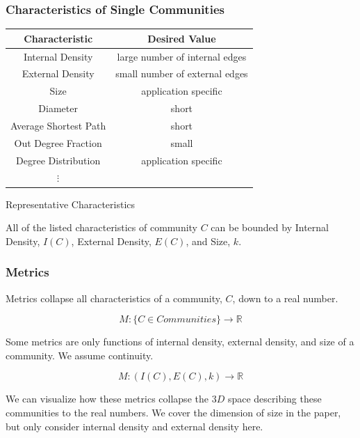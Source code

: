 \documentclass{beamer}
\begin{document}
\begin{frame}\frametitle{Characteristics of Single Communities}

\begin{table}[t]
\centering
\begin{tabular}{c|c}
Characteristic & Desired Value \\ \hline
 {\sc Internal Density} &  large number of internal edges \\
 {\sc External Density} & small number of external edges \\
 {\sc Size} & application specific\\
 {\sc Diameter} & short \\
{\sc Average Shortest Path} & short \\
{\sc Out Degree Fraction} & small \\
{\sc Degree Distribution} & application specific \\ 
$\vdots$ &
\end{tabular}
\end{table}

\begin{block}{Representative Characteristics}
\begin{center}
All of the listed characteristics of community $C$ can be bounded by {\sc Internal Density}, $I(C)$, {\sc External Density}, $E(C)$, and {\sc Size}, $k$.
\end{center}
\end{block}
\end{frame}


\begin{frame}\frametitle{Metrics}

Metrics collapse all characteristics of a community, $C$, down to a real number.
\begin{definition}
\begin{equation}
 M : \{C \in Communities\} \rightarrow \mathbb{R}\nonumber
\end{equation}
\end{definition}
Some metrics are only functions of internal density, external density, and size of a community. We assume continuity.
\begin{definition}
\begin{equation}
 M : (I(C), E(C), k) \rightarrow \mathbb{R}\nonumber
\end{equation}
\end{definition}
 We can visualize how these metrics collapse the $3D$ space describing these communities to the real numbers.  We cover the dimension of size in the paper, but only consider internal density and external density here.
\end{frame}
\end{document}
